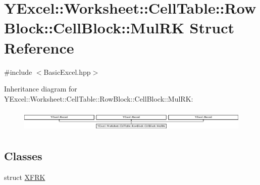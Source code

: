 \hypertarget{struct_y_excel_1_1_worksheet_1_1_cell_table_1_1_row_block_1_1_cell_block_1_1_mul_r_k}{}\section{Y\+Excel\+:\+:Worksheet\+:\+:Cell\+Table\+:\+:Row\+Block\+:\+:Cell\+Block\+:\+:Mul\+R\+K Struct Reference}
\label{struct_y_excel_1_1_worksheet_1_1_cell_table_1_1_row_block_1_1_cell_block_1_1_mul_r_k}


{\ttfamily \#include $<$Basic\+Excel.\+hpp$>$}

Inheritance diagram for Y\+Excel\+:\+:Worksheet\+:\+:Cell\+Table\+:\+:Row\+Block\+:\+:Cell\+Block\+:\+:Mul\+R\+K\+:\begin{figure}[H]
\begin{center}
\leavevmode
\includegraphics[height=1.075889cm]{struct_y_excel_1_1_worksheet_1_1_cell_table_1_1_row_block_1_1_cell_block_1_1_mul_r_k}
\end{center}
\end{figure}
\subsection*{Classes}
\begin{DoxyCompactItemize}
\item 
struct \hyperlink{struct_y_excel_1_1_worksheet_1_1_cell_table_1_1_row_block_1_1_cell_block_1_1_mul_r_k_1_1_x_f_r_k}{X\+F\+R\+K}
\end{DoxyCompactItemize}
